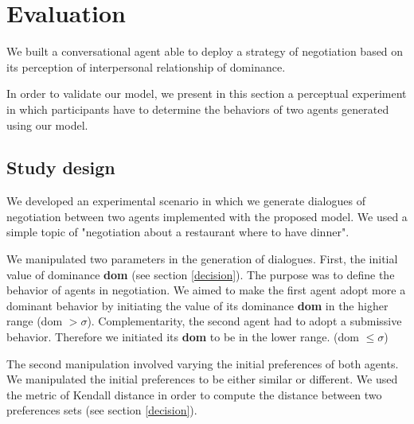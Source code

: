 \documentclass{llncs}
\begin{document}
	
				  
		\section{Evaluation}
		
		 We built a conversational agent able to deploy a strategy of negotiation based on its perception of interpersonal relationship of dominance. 
		 
		 
		 In order to validate our model, we present in this section a perceptual experiment in which participants have to determine the behaviors of two agents generated using our model. 
		 
			\subsection{Study design}
		We developed an experimental scenario in which we generate dialogues of negotiation between two agents implemented with the proposed model. We used a simple topic of "negotiation about a restaurant where to have dinner".
		
		We manipulated two parameters in the generation of dialogues. First, the initial value of dominance \textbf{dom} (see section \ref{decision}). The purpose was to define the behavior of agents in negotiation. 
		We aimed to make the first agent adopt more a dominant behavior by initiating the value of its dominance \textbf{dom} in the higher range (dom  $>\sigma$). Complementarity, the second agent had to adopt a submissive behavior. Therefore we initiated its \textbf{dom} to be in the lower range. (dom  $ \leq \sigma$)
		
		The second manipulation involved varying the initial preferences of both agents.  We manipulated the initial preferences to be either similar or different. We used the metric of Kendall distance \cite{bra2013Kendall} in order to compute the distance between two preferences sets (see section \ref{decision}).  
				
\end{document}
